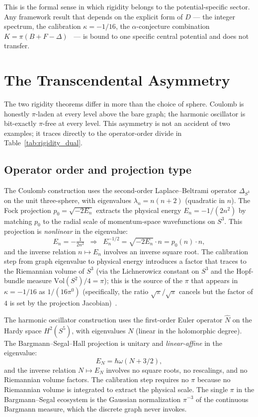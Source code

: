 \documentclass[twocolumn,pra,amsmath,amssymb,superscriptaddress]{revtex4-2}
\begin{document}
This is the formal sense in which rigidity belongs to the
potential-specific sector.  Any framework result that depends on
the explicit form of $D$ --- the integer spectrum, the calibration
$\kappa = -1/16$, the $\alpha$-conjecture combination
$K = \pi(B + F - \Delta)$~\cite{paper2_alpha} --- is bound to one
specific central potential and does not transfer.

\section{The Transcendental Asymmetry}
\label{sec:transcendental}

The two rigidity theorems differ in more than the choice of sphere.
Coulomb is honestly $\pi$-laden at every level above the bare graph;
the harmonic oscillator is bit-exactly $\pi$-free at every level.
This asymmetry is not an accident of two examples; it traces directly
to the operator-order divide in Table~\ref{tab:rigidity_dual}.

\subsection{Operator order and projection type}

The Coulomb construction uses the second-order Laplace--Beltrami
operator $\Delta_{S^3}$ on the unit three-sphere, with eigenvalues
$\lambda_n = n(n+2)$ (quadratic in $n$).  The Fock projection
$p_0 = \sqrt{-2 E_n}$ extracts the physical energy $E_n = -1/(2n^2)$
by matching $p_0$ to the radial scale of momentum-space wavefunctions
on $S^3$.  This projection is \emph{nonlinear} in the eigenvalue:
\[
  E_n = -\tfrac{1}{2 n^2}
  \;\;\Longrightarrow\;\;
  E_n^{-1/2} = \sqrt{-2 E_n} \cdot n
  = p_0(n) \cdot n,
\]
and the inverse relation $n \mapsto E_n$ involves an inverse square
root.  The calibration step from graph eigenvalue to physical energy
introduces a factor that traces to the Riemannian volume of $S^3$
(via the Lichnerowicz constant on $S^3$ and the Hopf-bundle measure
$\mathrm{Vol}(S^2)/4 = \pi$); this is the source of the $\pi$ that
appears in $\kappa = -1/16$ as $1/(16\pi^0)$ (specifically, the
ratio $\sqrt{\pi}/\sqrt{\pi}$ cancels but the factor of $4$ is set
by the projection Jacobian)~\cite{paper7,paper24}.

The harmonic oscillator construction uses the first-order Euler
operator $\hat{N}$ on the Hardy space $H^2(S^5)$, with eigenvalues
$N$ (linear in the holomorphic degree).  The
Bargmann--Segal--Hall projection is unitary and \emph{linear-affine}
in the eigenvalue:
\[
  E_N = \hbar\omega(N + 3/2),
\]
and the inverse relation $N \mapsto E_N$ involves no square roots,
no rescalings, and no Riemannian volume factors.  The calibration
step requires no $\pi$ because no Riemannian volume is integrated
to extract the physical scale.  The single $\pi$ in the
Bargmann--Segal ecosystem is the Gaussian normalization $\pi^{-3}$
of the continuous Bargmann measure, which the discrete graph never
invokes.
\end{document}
